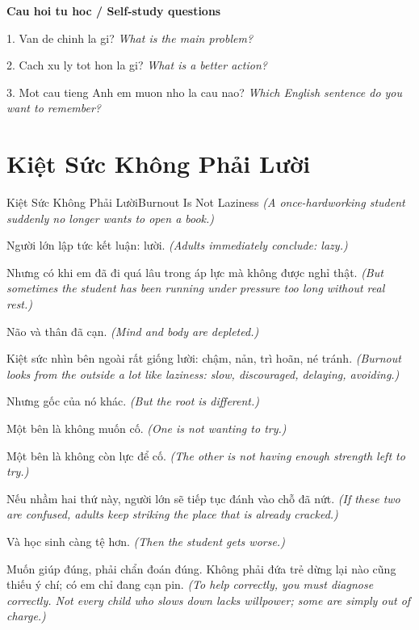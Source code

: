 \begin{tuhocnhanh}
\textbf{Cau hoi tu hoc / Self-study questions}

1. Van de chinh la gi? \textit{What is the main problem?}

2. Cach xu ly tot hon la gi? \textit{What is a better action?}

3. Mot cau tieng Anh em muon nho la cau nao? \textit{Which English sentence do you want to remember?}
\end{tuhocnhanh}
\ngancach

\section{Kiệt Sức Không Phải Lười}
\begin{truyen}{Kiệt Sức Không Phải Lười}{Burnout Is Not Laziness}
\textit{(A once-hardworking student suddenly no longer wants to open a book.)}

Người lớn lập tức kết luận: lười.
\textit{(Adults immediately conclude: lazy.)}

Nhưng có khi em đã đi quá lâu trong áp lực mà không được nghỉ thật.
\textit{(But sometimes the student has been running under pressure too long without real rest.)}

Não và thân đã cạn.
\textit{(Mind and body are depleted.)}

Kiệt sức nhìn bên ngoài rất giống lười: chậm, nản, trì hoãn, né tránh.
\textit{(Burnout looks from the outside a lot like laziness: slow, discouraged, delaying, avoiding.)}

Nhưng gốc của nó khác.
\textit{(But the root is different.)}

Một bên là không muốn cố.
\textit{(One is not wanting to try.)}

Một bên là không còn lực để cố.
\textit{(The other is not having enough strength left to try.)}

Nếu nhầm hai thứ này, người lớn sẽ tiếp tục đánh vào chỗ đã nứt.
\textit{(If these two are confused, adults keep striking the place that is already cracked.)}

Và học sinh càng tệ hơn.
\textit{(Then the student gets worse.)}

\end{truyen}

\begin{baihoc}
Muốn giúp đúng, phải chẩn đoán đúng. Không phải đứa trẻ dừng lại nào cũng thiếu ý chí; có em chỉ đang cạn pin.
\textit{(To help correctly, you must diagnose correctly. Not every child who slows down lacks willpower; some are simply out of charge.)}
\end{baihoc}

